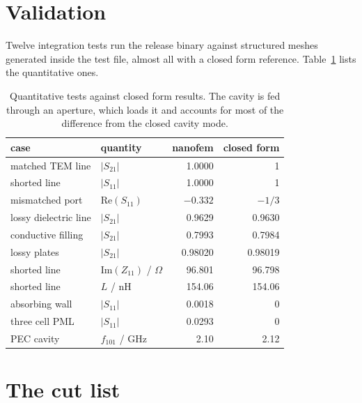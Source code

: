 \documentclass[11pt]{article}
\begin{document}
\section{Validation}

Twelve integration tests run the release binary against structured meshes
generated inside the test file, almost all with a closed form reference.
Table~\ref{tab:valid} lists the quantitative ones.

\begin{table}[H]
\centering
\begin{tabular}{llrr}
\toprule
case & quantity & nanofem & closed form \\
\midrule
matched TEM line & \(|S_{21}|\) & 1.0000 & 1 \\
shorted line & \(|S_{11}|\) & 1.0000 & 1 \\
mismatched port & \(\mathrm{Re}(S_{11})\) & \(-0.332\) & \(-1/3\) \\
lossy dielectric line & \(|S_{21}|\) & 0.9629 & 0.9630 \\
conductive filling & \(|S_{21}|\) & 0.7993 & 0.7984 \\
lossy plates & \(|S_{21}|\) & 0.98020 & 0.98019 \\
shorted line & \(\mathrm{Im}(Z_{11})\) / \(\Omega\) & 96.801 & 96.798 \\
shorted line & \(L\) / nH & 154.06 & 154.06 \\
absorbing wall & \(|S_{11}|\) & 0.0018 & 0 \\
three cell PML & \(|S_{11}|\) & 0.0293 & 0 \\
PEC cavity & \(f_{101}\) / GHz & 2.10 & 2.12 \\
\bottomrule
\end{tabular}
\caption{Quantitative tests against closed form results. The cavity is fed
through an aperture, which loads it and accounts for most of the difference
from the closed cavity mode.}
\label{tab:valid}
\end{table}



\section{The cut list}
\label{sec:cuts}
\end{document}
